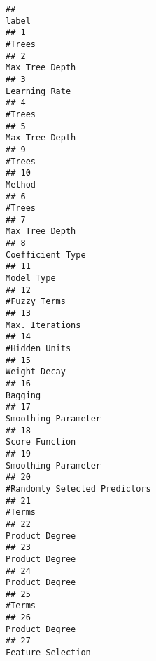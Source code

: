 \documentclass[
]{article}
\begin{document}
\begin{verbatim}
##                                                                                       label
## 1                                                                                    #Trees
## 2                                                                            Max Tree Depth
## 3                                                                             Learning Rate
## 4                                                                                    #Trees
## 5                                                                            Max Tree Depth
## 9                                                                                    #Trees
## 10                                                                                   Method
## 6                                                                                    #Trees
## 7                                                                            Max Tree Depth
## 8                                                                          Coefficient Type
## 11                                                                               Model Type
## 12                                                                             #Fuzzy Terms
## 13                                                                          Max. Iterations
## 14                                                                            #Hidden Units
## 15                                                                             Weight Decay
## 16                                                                                  Bagging
## 17                                                                      Smoothing Parameter
## 18                                                                           Score Function
## 19                                                                      Smoothing Parameter
## 20                                                            #Randomly Selected Predictors
## 21                                                                                   #Terms
## 22                                                                           Product Degree
## 23                                                                           Product Degree
## 24                                                                           Product Degree
## 25                                                                                   #Terms
## 26                                                                           Product Degree
## 27                                                                        Feature Selection

\end{verbatim}
\end{document}
